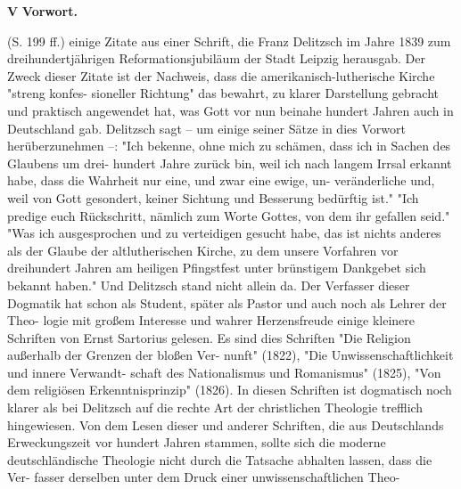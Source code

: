 \textbf{V}
\centering\textbf{Vorwort.}

(S. 199 ff.) einige Zitate aus einer Schrift, die Franz Delitzsch
im Jahre 1839 zum dreihundertjährigen Reformationsjubiläum
der Stadt Leipzig herausgab. Der Zweck dieser Zitate ist der
Nachweis, dass die amerikanisch-lutherische Kirche "streng konfes-
sioneller Richtung" das bewahrt, zu klarer Darstellung gebracht
und praktisch angewendet hat, was Gott vor nun beinahe hundert
Jahren auch in Deutschland gab. Delitzsch sagt -- um einige
seiner Sätze in dies Vorwort herüberzunehmen --: "Ich bekenne,
ohne mich zu schämen, dass ich in Sachen des Glaubens um drei-
hundert Jahre zurück bin, weil ich nach langem Irrsal erkannt
habe, dass die Wahrheit nur eine, und zwar eine ewige, un-
veränderliche und, weil von Gott gesondert, keiner Sichtung und
Besserung bedürftig ist." "Ich predige euch Rückschritt,
nämlich zum Worte Gottes, von dem ihr gefallen seid." "Was
ich ausgesprochen und zu verteidigen gesucht habe, das ist nichts
anderes als der Glaube der altlutherischen Kirche, zu dem unsere
Vorfahren vor dreihundert Jahren am heiligen Pfingstfest unter
brünstigem Dankgebet sich bekannt haben." Und Delitzsch stand
nicht allein da. Der Verfasser dieser Dogmatik hat schon als
Student, später als Pastor und auch noch als Lehrer der Theo-
logie mit großem Interesse und wahrer Herzensfreude einige
kleinere Schriften von Ernst Sartorius gelesen. Es sind dies
Schriften "Die Religion außerhalb der Grenzen der bloßen Ver-
nunft" (1822), "Die Unwissenschaftlichkeit und innere Verwandt-
schaft des Nationalismus und Romanismus" (1825), "Von dem
religiösen Erkenntnisprinzip" (1826). In diesen Schriften ist
dogmatisch noch klarer als bei Delitzsch auf die rechte Art der
christlichen Theologie trefflich hingewiesen. Von dem Lesen dieser
und anderer Schriften, die aus Deutschlands Erweckungszeit vor
hundert Jahren stammen, sollte sich die moderne deutschländische
Theologie nicht durch die Tatsache abhalten lassen, dass die Ver-
fasser derselben unter dem Druck einer unwissenschaftlichen Theo-